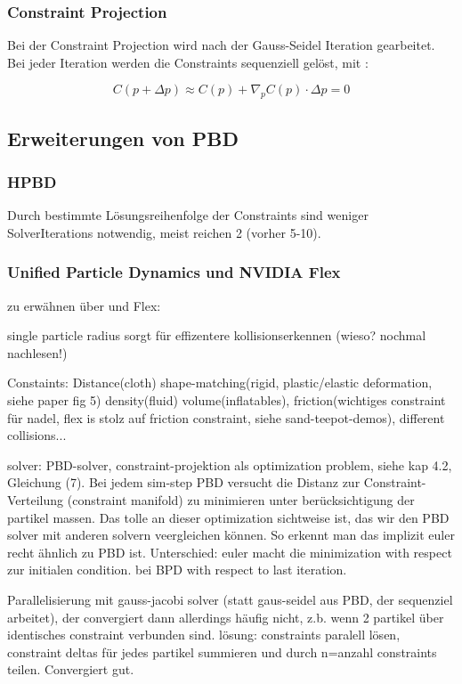 \subsubsection{Constraint Projection}
Bei der Constraint Projection wird nach der Gauss-Seidel Iteration gearbeitet. Bei jeder Iteration werden die Constraints sequenziell gelöst, mit \cite{PBD}:

\begin{equation}
C(p+\Delta p) \approx C(p) + \nabla_p C(p) \cdot \Delta p = 0
\label{form_C}
\end{equation}



\subsection{Erweiterungen von PBD}
\subsubsection{HPBD}
Durch bestimmte Lösungsreihenfolge der Constraints sind weniger SolverIterations notwendig, meist reichen 2 (vorher 5-10).

\subsubsection{Unified Particle Dynamics und NVIDIA Flex}
zu erwähnen über \cite{UPP} und Flex: 

single particle radius sorgt für effizentere kollisionserkennen (wieso? nochmal nachlesen!)

Constaints: Distance(cloth) shape-matching(rigid, plastic/elastic deformation, siehe paper fig 5) density(fluid) volume(inflatables), friction(wichtiges constraint für nadel, flex is stolz auf friction constraint, siehe sand-teepot-demos), different collisions...

solver: PBD-solver, \cite{UPP} constraint-projektion als optimization problem, siehe kap 4.2, Gleichung (7). Bei jedem sim-step PBD versucht die Distanz zur Constraint-Verteilung (constraint manifold) zu minimieren unter berücksichtigung der partikel massen. Das tolle an dieser optimization sichtweise ist, das wir den PBD solver mit anderen solvern veergleichen können. So erkennt man das implizit euler recht ähnlich zu PBD ist. Unterschied: euler macht die minimization with respect zur initialen condition. bei BPD with respect to last iteration.

Parallelisierung mit gauss-jacobi solver (statt gaus-seidel aus PBD, der sequenziel arbeitet), der convergiert dann allerdings häufig nicht, z.b. wenn 2 partikel über identisches constraint verbunden sind. lösung: constraints paralell lösen, constraint deltas für jedes partikel summieren und durch n=anzahl constraints teilen. Convergiert gut. 






